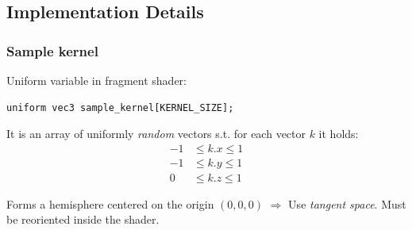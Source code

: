 \documentclass{beamer}
\begin{document}
\subsection{Implementation Details}

\begin{frame}[fragile]
\frametitle{Sample kernel}
Uniform variable in fragment shader:
\begin{verbatim}
uniform vec3 sample_kernel[KERNEL_SIZE];
\end{verbatim}

It is an array of uniformly \emph{random} vectors s.t. for each vector $ k $ it holds:
\begin{align*}
-1 & \le k.x \le 1 \\
-1 & \le k.y \le 1 \\
0 & \le k.z \le 1
\end{align*}

Forms a hemisphere centered on the origin $ (0, 0, 0) $ $ \Rightarrow $ Use \emph{tangent space}. Must be reoriented inside the shader.
\end{frame}
\end{document}

